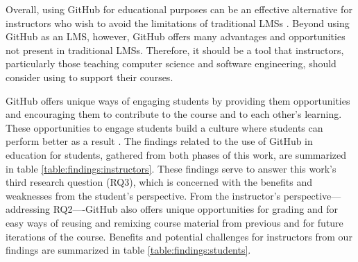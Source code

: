 Overall, using GitHub for educational purposes can be an effective alternative for instructors who wish to avoid the limitations of traditional LMSs \cite{garcia2011opening}. Beyond using GitHub as an LMS, however, GitHub offers many advantages and opportunities not present in traditional LMSs. Therefore, it should be a tool that instructors, particularly those teaching computer science and software engineering, should consider using to support their courses.

GitHub offers unique ways of engaging students by providing them opportunities and encouraging them to contribute to the course and to each other's learning. These opportunities to engage students build a culture where students can perform better as a result \cite{kuh2001assessing}. The findings related to the use of GitHub in education for students, gathered from both phases of this work, are summarized in table \ref{table:findings:instructors}. These findings serve to answer this work's third research question (RQ3), which is concerned with the benefits and weaknesses from the student's perspective. From the instructor's perspective---addressing RQ2----GitHub also offers unique opportunities for grading and for easy ways of reusing and remixing course material from previous and for future iterations of the course. Benefits and potential challenges for instructors from our findings are summarized in table \ref{table:findings:students}.

